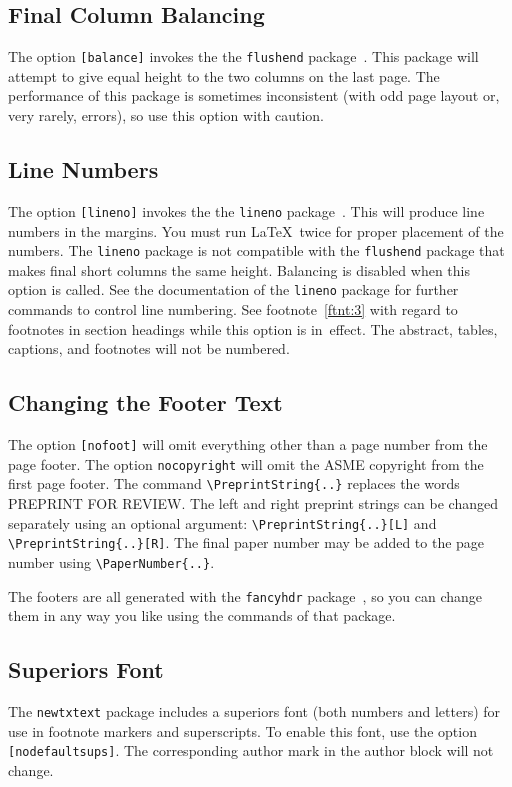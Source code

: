 \documentclass[largesc,upint,varvw,barcolor=Red4,nocopyright,hyphenate,balance,lang-second=french,lang=english]{asmejour}
\begin{document}
\subsection{Final Column Balancing} The option \texttt{[balance]} invokes the the \texttt{flushend} package~\cite{tolusis}.
This package will attempt to give equal height to the two columns on the last page. The performance of this package is sometimes inconsistent (with odd page layout or, very rarely, errors), so use this option with caution.

\subsection{Line Numbers} The option \texttt{[lineno]} invokes the the \texttt{lineno} package~\cite{bottcher}.  This will produce line numbers in the margins. You must run \LaTeX\ twice for proper placement of the numbers. The \texttt{lineno} package is not compatible with the \texttt{flushend} package that makes final short columns the same height. Balancing is disabled when this option is called. See the documentation of the \texttt{lineno} package for further commands to control line numbering. See footnote~\ref{ftnt:3} with regard to footnotes in section headings while this option is in~effect. The abstract, tables, captions, and footnotes will not be numbered.

\subsection{Changing the Footer Text}\label{sec:footer} The option \texttt{[nofoot]} will omit everything other than a page number from the page footer.  The option \texttt{nocopyright} will omit the ASME copyright from the first page footer. The command \verb|\PreprintString{..}| replaces the words \textsf{PREPRINT FOR REVIEW}. The left and right preprint strings can be changed separately using an optional argument: \verb|\PreprintString{..}[L]| and \verb|\PreprintString{..}[R]|.
The final paper number may be added to the page number using \verb|\PaperNumber{..}|.

The footers are all generated with the \texttt{fancyhdr} package~\cite{oostrum}, so you can change them in any way you like using the commands of that package. 

\subsection{Superiors Font} The \texttt{newtxtext} package includes a superiors font (both numbers and letters) for use in footnote markers and superscripts. To enable this font, use the option \texttt{[nodefaultsups]}. The corresponding author mark in the author block will not change.
\end{document}
